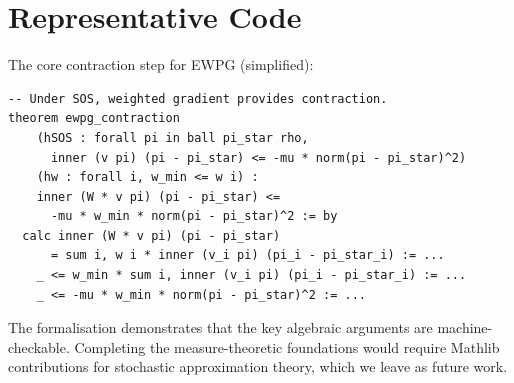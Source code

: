 \documentclass[a4paper,oneside,11pt]{report}
\begin{document}
\section{Representative Code}

The core contraction step for EWPG (simplified):

\begin{verbatim}
-- Under SOS, weighted gradient provides contraction.
theorem ewpg_contraction
    (hSOS : forall pi in ball pi_star rho,
      inner (v pi) (pi - pi_star) <= -mu * norm(pi - pi_star)^2)
    (hw : forall i, w_min <= w i) :
    inner (W * v pi) (pi - pi_star) <=
      -mu * w_min * norm(pi - pi_star)^2 := by
  calc inner (W * v pi) (pi - pi_star)
      = sum i, w i * inner (v_i pi) (pi_i - pi_star_i) := ...
    _ <= w_min * sum i, inner (v_i pi) (pi_i - pi_star_i) := ...
    _ <= -mu * w_min * norm(pi - pi_star)^2 := ...
\end{verbatim}

The formalisation demonstrates that the key algebraic arguments are machine-checkable. Completing the measure-theoretic foundations would require Mathlib contributions for stochastic approximation theory, which we leave as future work.




\end{document}
